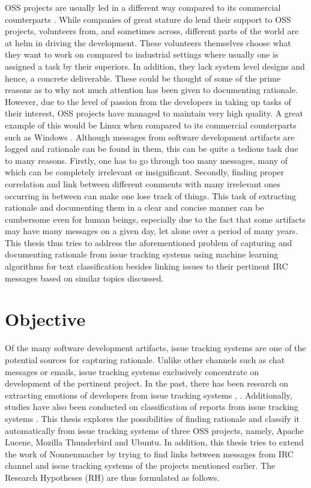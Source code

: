 \documentclass[a4paper,12pt,twoside]{report}
\begin{document}
\newline \newline
\acs{OSS} projects are usually led in a different way compared to its commercial counterparts \cite{mockus2002two}. While companies of great stature do lend their support to \acs{OSS} projects, volunteers from, and sometimes across, different parts of the world are at helm in driving the development. These volunteers themselves choose what they want to work on compared to industrial settings where usually one is assigned a task by their superiors. In addition, they lack system level designs and hence, a concrete deliverable. These could be thought of some of the prime reasons as to why not much attention has been given to documenting rationale. However, due to the level of passion from the developers in taking up tasks of their interest, \acs{OSS} projects have managed to maintain very high quality. A great example of this would be Linux when compared to its commercial counterparts such as Windows \cite{mockus2002two}. 
\newline \newline
Although messages from software development artifacts are logged and rationale can be found in them, this can be quite a tedious task due to many reasons. Firstly, one has to go through too many messages, many of which can be completely irrelevant or insignificant. Secondly, finding proper correlation and link between different comments with many irrelevant ones occurring in between can make one lose track of things. This task of extracting rationale and documenting them in a clear and concise manner can be cumbersome even for human beings, especially due to the fact that some artifacts may have many messages on a given day, let alone over a period of many years. This thesis thus tries to address the aforementioned problem of capturing and documenting rationale from issue tracking systems using machine learning algorithms for text classification besides linking issues to their pertinent \acs{IRC} messages based on similar topics discussed.

\section{Objective}
Of the many software development artifacts, issue tracking systems are one of the potential sources for capturing rationale. Unlike other channels such as chat messages or emails, issue tracking systems exclusively concentrate on development of the pertinent project. In the past, there has been research on extracting emotions of developers from issue tracking systems \cite{Marshall2016}, \cite{Robillard2017}. Additionally, studies have also been conducted on classification of reports from issue tracking systems \cite{Fan2017}. This thesis explores the possibilities of finding rationale and classify it automatically from issue tracking systems of three \acs{OSS} projects, namely, Apache Lucene, Mozilla Thunderbird and Ubuntu. In addition, this thesis tries to extend the work of Nonnenmacher \cite{Nonnenmacher2017} by trying to find links between messages from \acs{IRC} channel and issue tracking systems of the projects mentioned earlier. The Research Hypotheses (RH) are thus formulated as follows.
\end{document}
